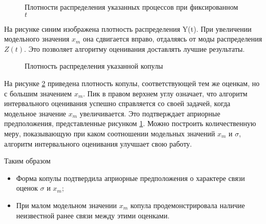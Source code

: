 \begin{figure}[h]
	{}
	\caption{Плотности распределения указанных процессов при фиксированном $t$}
	\label{fig:zy}
\end{figure}
На рисунке синим изображена плотность распределения Y(t). При увеличении модельного значения $x_m$ она сдвигается вправо, отдаляясь от моды распределения $Z(t)$. Это позволяет алгоритму оценивания доставлять лучшие результаты.

\begin{figure}[h]
	{}
	\caption{Плотность распределения указанной копулы}
	\label{fig:bigxm}
\end{figure}
На рисунке \ref{fig:bigxm} приведена плотность копулы, соответствующей тем же оценкам, но с большим значением $x_m$. Пик в правом верхнем углу означает, что алгоритм интервального оценивания успешно справляется со своей задачей, когда модельное значение $x_m$ увеличивается. Это подтверждает априорные предположения, представленные рисунком \ref{fig:zy}. Можно построить количественную меру, показывающую при каком соотношении модельных значений $x_m$ и $\sigma$, алгоритм интервального оценивания улучшает свою работу.

Таким образом
\begin{itemize}
  \item Форма копулы подтвердила априорные предположения о характере связи оценок $\sigma$ и $x_m$;
  \item При малом модельном значении $x_m$ копула продемонстрировала наличие неизвестной ранее связи между этими оценками.
\end{itemize}

\clearpage